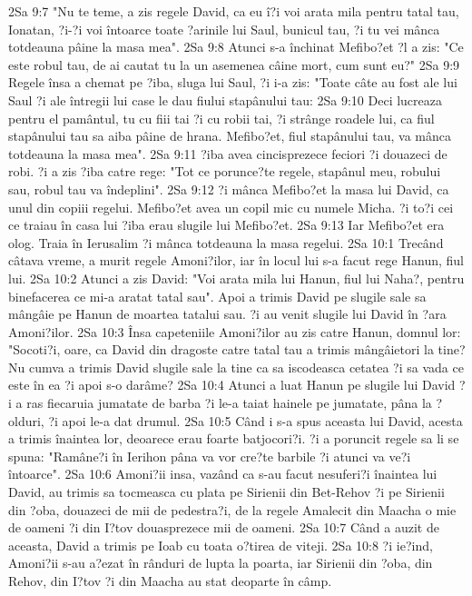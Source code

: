 2Sa 9:7  "Nu te teme, a zis regele David, ca eu î?i voi arata mila pentru tatal tau, Ionatan, ?i-?i voi întoarce toate ?arinile lui Saul, bunicul tau, ?i tu vei mânca totdeauna pâine la masa mea".
2Sa 9:8  Atunci s-a închinat Mefibo?et ?l a zis: "Ce este robul tau, de ai cautat tu la un asemenea câine mort, cum sunt eu?"
2Sa 9:9  Regele însa a chemat pe ?iba, sluga lui Saul, ?i i-a zis: "Toate câte au fost ale lui Saul ?i ale întregii lui case le dau fiului stapânului tau:
2Sa 9:10  Deci lucreaza pentru el pamântul, tu cu fiii tai ?i cu robii tai, ?i strânge roadele lui, ca fiul stapânului tau sa aiba pâine de hrana. Mefibo?et, fiul stapânului tau, va mânca totdeauna la masa mea".
2Sa 9:11  ?iba avea cincisprezece feciori ?i douazeci de robi. ?i a zis ?iba catre rege: "Tot ce porunce?te regele, stapânul meu, robului sau, robul tau va îndeplini".
2Sa 9:12  ?i mânca Mefibo?et la masa lui David, ca unul din copiii regelui. Mefibo?et avea un copil mic cu numele Micha. ?i to?i cei ce traiau în casa lui ?iba erau slugile lui Mefibo?et.
2Sa 9:13  Iar Mefibo?et era olog. Traia în Ierusalim ?i mânca totdeauna la masa regelui.
2Sa 10:1  Trecând câtava vreme, a murit regele Amoni?ilor, iar în locul lui s-a facut rege Hanun, fiul lui.
2Sa 10:2  Atunci a zis David: "Voi arata mila lui Hanun, fiul lui Naha?, pentru binefacerea ce mi-a aratat tatal sau". Apoi a trimis David pe slugile sale sa mângâie pe Hanun de moartea tatalui sau. ?i au venit slugile lui David în ?ara Amoni?ilor.
2Sa 10:3  Însa capeteniile Amoni?ilor au zis catre Hanun, domnul lor: "Socoti?i, oare, ca David din dragoste catre tatal tau a trimis mângâietori la tine? Nu cumva a trimis David slugile sale la tine ca sa iscodeasca cetatea ?i sa vada ce este în ea ?i apoi s-o darâme?
2Sa 10:4  Atunci a luat Hanun pe slugile lui David ?i a ras fiecaruia jumatate de barba ?i le-a taiat hainele pe jumatate, pâna la ?olduri, ?i apoi le-a dat drumul.
2Sa 10:5  Când i s-a spus aceasta lui David, acesta a trimis înaintea lor, deoarece erau foarte batjocori?i. ?i a poruncit regele sa li se spuna: "Ramâne?i în Ierihon pâna va vor cre?te barbile ?i atunci va ve?i întoarce".
2Sa 10:6  Amoni?ii insa, vazând ca s-au facut nesuferi?i înaintea lui David, au trimis sa tocmeasca cu plata pe Sirienii din Bet-Rehov ?i pe Sirienii din ?oba, douazeci de mii de pedestra?i, de la regele Amalecit din Maacha o mie de oameni ?i din I?tov douasprezece mii de oameni.
2Sa 10:7  Când a auzit de aceasta, David a trimis pe Ioab cu toata o?tirea de viteji.
2Sa 10:8  ?i ie?ind, Amoni?ii s-au a?ezat în rânduri de lupta la poarta, iar Sirienii din ?oba, din Rehov, din I?tov ?i din Maacha au stat deoparte în câmp.
